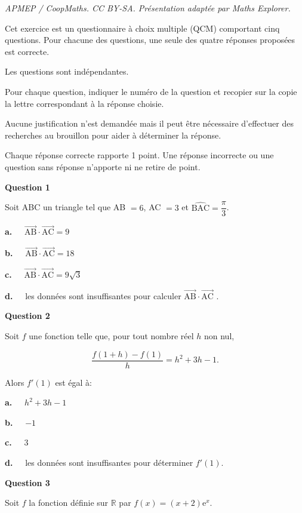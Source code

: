 \documentclass[10pt]{article}
\providecommand{\R}{\mathbb{R}}
\providecommand{\vect}[1]{\overrightarrow{#1}}
\begin{document}
\noindent\textit{APMEP / CoopMaths. CC BY-SA. Présentation adaptée par Maths Explorer.}\par\medskip
\medskip

Cet exercice est un questionnaire à choix multiple (QCM) comportant cinq questions. Pour chacune des questions, une seule des quatre réponses proposées est correcte.

Les questions sont indépendantes.

Pour chaque question, indiquer le numéro de la question et recopier sur la copie la lettre correspondant à la réponse choisie.

Aucune justification n'est demandée mais il peut être nécessaire d'effectuer des recherches au brouillon pour aider à déterminer la réponse.

Chaque réponse correcte rapporte 1 point. Une réponse incorrecte ou une question sans réponse n'apporte ni ne retire de point.

\medskip

\textbf{Question 1}

\medskip

Soit ABC un triangle tel que AB $= 6$, AC $= 3$ et $\widehat{\text{BAC}} = \dfrac{\pi}{3}$.

\textbf{a.~~} $\vect{\text{AB}} \cdot  \vect{\text{AC}} = 9$

\textbf{b.~~} $\vect{\text{AB}} \cdot  \vect{\text{AC}} = 18$

\textbf{c.~~} $\vect{\text{AB}} \cdot  \vect{\text{AC}}= 9\sqrt{3}$

\textbf{d.~~} les données sont insuffisantes pour calculer $\vect{\text{AB}} \cdot \vect{\text{AC}}$
.
\medskip

\textbf{Question 2}

\medskip

Soit $f$ une fonction telle que, pour tout nombre réel $h$ non nul,

\[\dfrac{f(1 + h) - f(1)}{h} =  h^2 + 3h - 1.\]

Alors $f'(1)$ est égal à:

\textbf{a.~~} $h^2 + 3h - 1$

\textbf{b.~~} $- 1$

\textbf{c.~~} 3

\textbf{d.~~} les données sont insuffisantes pour déterminer $f'(1)$.

\medskip

\textbf{Question 3}

\medskip

Soit $f$ la fonction définie sur $\R$ par $f(x) = (x + 2)\text{e}^x$.
\end{document}
